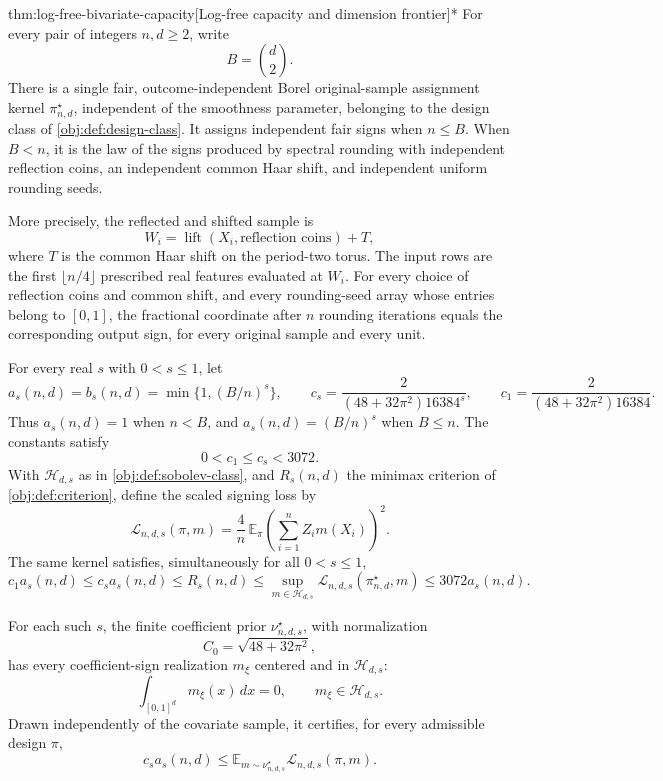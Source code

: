 \documentclass[11pt]{article}
\begin{document}
\begin{theoremv}{thm:log-free-bivariate-capacity}[Log-free capacity and dimension frontier]*
For every pair of integers \(n,d\geq2\), write
\[
B=\binom d2.
\]
There is a single fair, outcome-independent Borel original-sample assignment kernel \(\pi^\star_{n,d}\), independent of the smoothness parameter, belonging to the design class of \cref{obj:def:design-class}. It assigns independent fair signs when \(n\leq B\). When \(B<n\), it is the law of the signs produced by spectral rounding with independent reflection coins, an independent common Haar shift, and independent uniform rounding seeds.

More precisely, the reflected and shifted sample is
\[
W_i=\operatorname{lift}(X_i,\text{reflection coins})+T,
\]
where \(T\) is the common Haar shift on the period-two torus. The input rows are the first \(\lfloor n/4\rfloor\) prescribed real features evaluated at \(W_i\). For every choice of reflection coins and common shift, and every rounding-seed array whose entries belong to \([0,1]\), the fractional coordinate after \(n\) rounding iterations equals the corresponding output sign, for every original sample and every unit.

For every real \(s\) with \(0<s\leq1\), let
\[
a_s(n,d)=b_s(n,d)=\min\{1,(B/n)^s\},
\qquad
c_s=\frac{2}{(48+32\pi^2)16384^s},
\qquad
c_1=\frac{2}{(48+32\pi^2)16384}.
\]
Thus \(a_s(n,d)=1\) when \(n<B\), and \(a_s(n,d)=(B/n)^s\) when \(B\leq n\). The constants satisfy
\[
0<c_1\leq c_s<3072.
\]
With \(\mathcal H_{d,s}\) as in \cref{obj:def:sobolev-class}, and \(R_s(n,d)\) the minimax criterion of \cref{obj:def:criterion}, define the scaled signing loss by
\[
\mathcal L_{n,d,s}(\pi,m)
=\frac4n\,\mathbb E_{\pi}
 \left(\sum_{i=1}^n Z_i m(X_i)\right)^2.
\]
The same kernel satisfies, simultaneously for all \(0<s\leq1\),
\[
c_1a_s(n,d)
\leq c_sa_s(n,d)
\leq R_s(n,d)
\leq \sup_{m\in\mathcal H_{d,s}}
       \mathcal L_{n,d,s}(\pi^\star_{n,d},m)
\leq3072a_s(n,d).
\]

For each such \(s\), the finite coefficient prior \(\nu^\star_{n,d,s}\), with normalization
\[
C_0=\sqrt{48+32\pi^2},
\]
has every coefficient-sign realization \(m_\xi\) centered and in \(\mathcal H_{d,s}\):
\[
\int_{[0,1]^d}m_\xi(x)\,dx=0,
\qquad
m_\xi\in\mathcal H_{d,s}.
\]
Drawn independently of the covariate sample, it certifies, for every admissible design \(\pi\),
\[
c_sa_s(n,d)
\leq
\mathbb E_{m\sim\nu^\star_{n,d,s}}
       \mathcal L_{n,d,s}(\pi,m).
\]


\end{theoremv}
\end{document}
